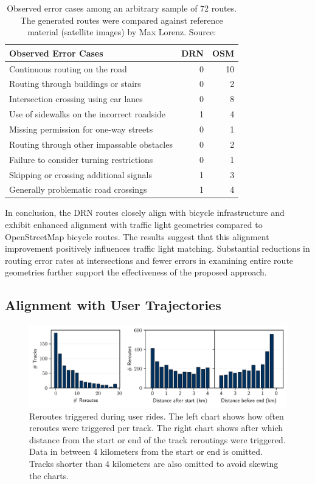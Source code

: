 \begin{table}[t]
\centering
\begin{tabular}{@{}lrr@{}}
\hline
\textbf{Observed Error Cases} & \textbf{DRN} & \textbf{OSM} \\ \hline
Continuous routing on the road & 0 & 10 \\
Routing through buildings or stairs & 0 & 2 \\
Intersection crossing using car lanes & 0 & 8 \\
Use of sidewalks on the incorrect roadside& 1 & 4 \\
Missing permission for one-way streets & 0 & 1 \\
Routing through other impassable obstacles & 0 & 2 \\
Failure to consider turning restrictions & 0 & 1 \\
Skipping or crossing additional signals & 1 & 3 \\
Generally problematic road crossings & 1 & 4 \\
\hline
\end{tabular}
\caption{Observed error cases among an arbitrary sample of 72 routes. The generated routes were compared against reference material (satellite images) by Max Lorenz. Source: \cite{lorenz_2022}}%
\label{tab:error-cases-max-lorenz}%
\end{table}

In conclusion, the DRN routes closely align with bicycle infrastructure and exhibit enhanced alignment with traffic light geometries compared to OpenStreetMap bicycle routes. The results suggest that this alignment improvement positively influences traffic light matching. Substantial reductions in routing error rates at intersections and fewer errors in examining entire route geometries further support the effectiveness of the proposed approach.

\subsection{Alignment with User Trajectories}

\begin{figure}[t]
\centering 
\includegraphics[width=\linewidth]{images/routing-reroutes-distribution.pdf}
\caption{Reroutes triggered during user rides. The left chart shows how often reroutes were triggered per track. The right chart shows after which distance from the start or end of the track reroutings were triggered. Data in between 4 kilometers from the start or end is omitted. Tracks shorter than 4 kilometers are also omitted to avoid skewing the charts.}
\label{fig:routing-reroutes-distribution}
\end{figure}

